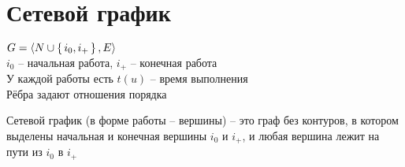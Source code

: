 \section{Сетевой график}

$ G = \langle N \cup \set{i_0, i_+}, E \rangle $ \\
$ i_0 $ -- начальная работа, $ i_+ $ -- конечная работа \\
У каждой работы есть $ t(u) $ -- время выполнения \\
Рёбра задают отношения порядка

\begin{definition}
	Сетевой график (в форме работы -- вершины) -- это граф без контуров, в котором выделены начальная и конечная вершины $ i_0 $ и $ i_+ $, и любая вершина лежит на пути из $ i_0 $ в $ i_+ $
\end{definition}

